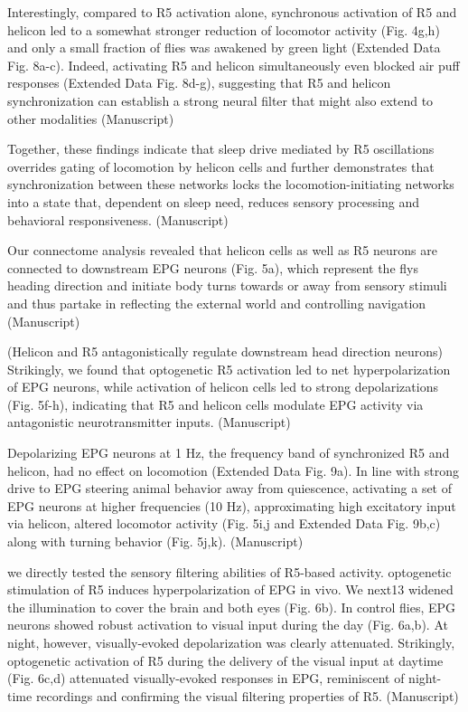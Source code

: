 Interestingly, compared to R5 activation alone, synchronous activation of R5 and helicon led
to a somewhat stronger reduction of locomotor activity (Fig. 4g,h) and only a small fraction of
flies was awakened by green light (Extended Data Fig. 8a-c). Indeed, activating R5 and helicon
simultaneously even blocked air puff responses (Extended Data Fig. 8d-g), suggesting that R5
and helicon synchronization can establish a strong neural filter that might also extend to other
modalities
\parencite{raccugliaCoherentMultilevelNetwork2022} (Manuscript)

Together, these findings indicate that sleep drive mediated by R5 oscillations overrides
gating of locomotion by helicon cells and further demonstrates that synchronization between
these networks locks the locomotion-initiating networks into a state that, dependent on sleep
need, reduces sensory processing and behavioral responsiveness.
\parencite{raccugliaCoherentMultilevelNetwork2022} (Manuscript)

Our connectome analysis revealed that helicon cells
as well as R5 neurons are connected to downstream EPG neurons (Fig. 5a), which represent
the flys heading direction and initiate body turns towards or away from sensory stimuli and
thus partake in reflecting the external world and controlling navigation
\parencite{raccugliaCoherentMultilevelNetwork2022} (Manuscript)

(Helicon and R5 antagonistically regulate downstream head direction neurons) Strikingly, we found that
optogenetic R5 activation led to net hyperpolarization of EPG neurons, while activation of
helicon cells led to strong depolarizations (Fig. 5f-h), indicating that R5 and helicon cells
modulate EPG activity via antagonistic neurotransmitter inputs.
\parencite{raccugliaCoherentMultilevelNetwork2022} (Manuscript)

Depolarizing EPG neurons at 1 Hz, the frequency band of synchronized R5 and helicon, had no
effect on locomotion (Extended Data Fig. 9a). In line with strong drive to EPG steering animal
behavior away from quiescence, activating a set of EPG neurons at higher frequencies (10 Hz),
approximating high excitatory input via helicon, altered locomotor activity (Fig. 5i,j and
Extended Data Fig. 9b,c) along with turning behavior (Fig. 5j,k).
\parencite{raccugliaCoherentMultilevelNetwork2022} (Manuscript)

we directly tested the sensory filtering abilities of R5-based activity. optogenetic stimulation of
R5 induces hyperpolarization of EPG in vivo. We next13
widened the illumination to cover the brain and both eyes (Fig. 6b). In control flies, EPG
neurons showed robust activation to visual input during the day (Fig. 6a,b). At night, however,
visually-evoked depolarization was clearly attenuated. Strikingly, optogenetic activation of R5
during the delivery of the visual input at daytime (Fig. 6c,d) attenuated visually-evoked
responses in EPG, reminiscent of night-time recordings and confirming the visual filtering
properties of R5.
\parencite{raccugliaCoherentMultilevelNetwork2022} (Manuscript)

